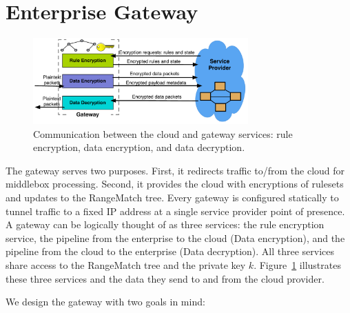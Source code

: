 
\section{Enterprise Gateway}

\label{sec:gateway}

\begin{figure}[t]
  \centering
  \includegraphics[width=3.25in]{fig/gateway2cloud}
  \caption[]{\label{fig:gatewaymeta} Communication between the cloud and gateway services: rule encryption, data encryption, and data decryption.} 
\end{figure}






The gateway serves two purposes. First, it redirects traffic to/from the cloud for middlebox processing. Second, it provides the cloud with encryptions of rulesets and updates to the RangeMatch tree.
Every gateway is configured statically to tunnel traffic to a fixed IP address at a single service provider point of presence.
A gateway can be logically thought of as three services: the rule encryption service, the pipeline from the enterprise to the cloud (Data encryption), and the pipeline from the cloud to the enterprise (Data decryption). 
All three services share access to the RangeMatch tree and the private key $k$.
Figure~\ref{fig:gatewaymeta} illustrates  these three services and the data they send to and from the cloud provider.

We design the gateway with two goals in mind: 

